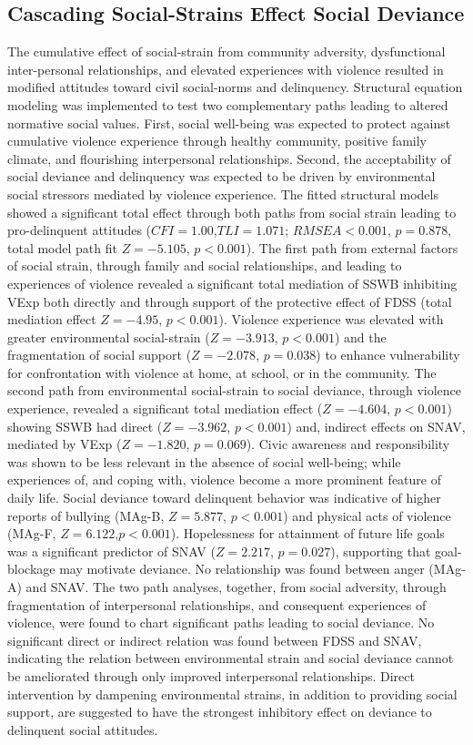 \documentclass[utf8]{article}
\begin{document}
\subsection{Cascading Social-Strains Effect Social Deviance}
The cumulative effect of social-strain from community adversity, dysfunctional inter-personal relationships, and elevated experiences with violence resulted in modified attitudes toward civil social-norms and delinquency. Structural equation modeling was implemented to test two complementary paths leading to altered normative social values. First, social well-being was expected to protect against cumulative violence experience through healthy community, positive family climate, and flourishing interpersonal relationships. Second, the acceptability of social deviance and delinquency was expected to be driven by environmental social stressors mediated by violence experience. The fitted structural models showed a significant total effect through both paths from social strain leading to pro-delinquent attitudes ($CFI=1.00$,$TLI=1.071$; $RMSEA<0.001$, $p=0.878$, total model path fit $Z=-5.105$, $p<0.001$). The first path from external factors of social strain, through family and social relationships, and leading to experiences of violence revealed a significant total mediation of SSWB inhibiting VExp both directly and through support of the protective effect of FDSS (total mediation effect $Z=-4.95$, $p<0.001$). Violence experience was elevated with greater environmental social-strain ($Z=-3.913$, $p<0.001$) and the fragmentation of social support ($Z=-2.078$, $p=0.038$) to enhance vulnerability for confrontation with violence at home, at school, or in the community. The second path from environmental social-strain to social deviance, through violence experience, revealed a significant total mediation effect  ($Z=-4.604$, $p<0.001$) showing SSWB had direct ($Z=-3.962$, $p<0.001$) and, indirect effects on SNAV, mediated by VExp ($Z=-1.820$, $p=0.069$). Civic awareness and responsibility was shown to be less relevant in the absence of social well-being; while experiences of, and coping with, violence become a more prominent feature of daily life. Social deviance toward delinquent behavior was indicative of higher reports of bullying (MAg-B, $Z=5.877$, $p<0.001$) and physical acts of violence (MAg-F, $Z=6.122$,$p<0.001$). Hopelessness for attainment of future life goals was a significant predictor of SNAV ($Z=2.217$, $p=0.027$), supporting that goal-blockage may motivate deviance. No relationship was found between anger (MAg-A) and SNAV. The two path analyses, together, from social adversity, through fragmentation of interpersonal relationships, and consequent experiences of violence, were found to chart significant paths leading to social deviance. No significant direct or indirect relation was found between FDSS and SNAV, indicating the relation between environmental strain and social deviance cannot be ameliorated through only improved interpersonal relationships. Direct intervention by dampening environmental strains, in addition to providing social support, are suggested to have the strongest inhibitory effect on deviance to delinquent social attitudes. 
\end{document}
